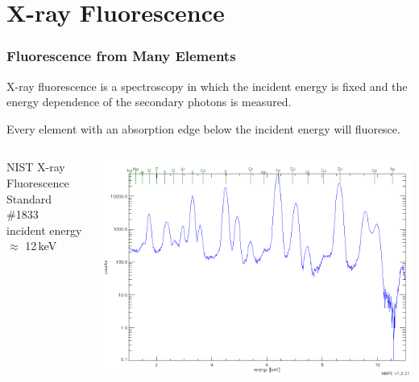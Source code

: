 \documentclass[10pt, xcolor=x11names, compress, handout]{beamer}
\begin{document}
\section[XRF]{X-ray Fluorescence}
\begin{frame}
  \frametitle{Fluorescence from Many Elements}
  X-ray fluorescence is a {\color{Purple4}spectroscopy} in which the
  incident energy is fixed and the energy dependence of the secondary
  photons is measured.

  \bigskip

  Every element with an absorption edge \alert{below} the incident
  energy will fluoresce.

  \begin{columns}
    \begin{column}{0.4\linewidth}
      \begin{center}
        NIST X-ray Fluorescence Standard \#1833\\[2ex]
        incident energy $\approx$ 12\,keV
      \end{center}

    \end{column}
    \begin{column}{0.6\linewidth}
      \includegraphics[width=\linewidth]{xrf/NBS1833.png}      
    \end{column}
  \end{columns}
\end{frame}
\end{document}
